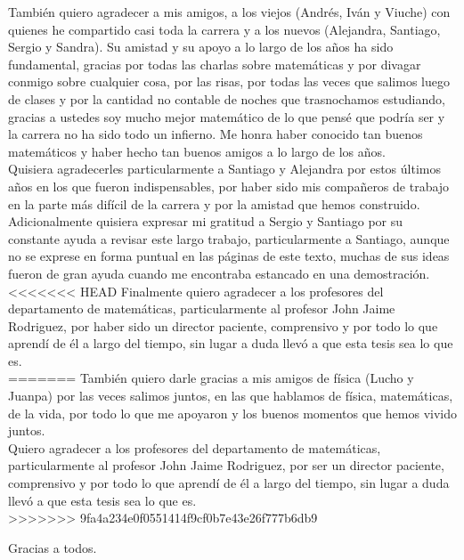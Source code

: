 También quiero agradecer a mis amigos, a los viejos (Andrés, Iván y Viuche) con quienes he compartido casi toda la carrera y a los nuevos (Alejandra, Santiago, Sergio y Sandra). Su amistad y su apoyo a lo largo de los años ha sido fundamental, gracias por todas las charlas sobre matemáticas y por divagar conmigo sobre cualquier cosa, por las risas, por todas las veces que salimos luego de clases y por la cantidad no contable de noches que trasnochamos estudiando, gracias a ustedes soy mucho mejor matemático de lo que pensé que podría ser y la carrera no ha sido todo un infierno. Me honra haber conocido tan buenos matemáticos y haber hecho tan buenos amigos a lo largo de los años.\\
Quisiera agradecerles particularmente a Santiago y Alejandra por estos últimos años en los que fueron indispensables, por haber sido mis compañeros de trabajo en la parte más difícil de la carrera y por la amistad que hemos construido.\\

Adicionalmente quisiera expresar mi gratitud a Sergio y Santiago por su constante ayuda a revisar este largo trabajo, particularmente a Santiago, aunque no se  exprese en forma puntual en las páginas de este texto, muchas de sus ideas fueron de gran ayuda cuando me encontraba estancado en una demostración.\\

<<<<<<< HEAD
Finalmente quiero agradecer a los profesores del departamento de matemáticas, particularmente al profesor John Jaime Rodriguez, por haber sido un director paciente, comprensivo y por todo lo que aprendí de él a largo del tiempo, sin lugar a duda llevó a que esta tesis sea lo que es.\\
=======
También quiero darle gracias a  mis amigos de física (Lucho y Juanpa) por las veces salimos juntos, en las que hablamos de física, matemáticas, de la vida, por todo lo que me apoyaron y los buenos momentos que hemos vivido juntos.\\

Quiero agradecer a los profesores del departamento de matemáticas, particularmente al profesor John Jaime Rodriguez, por ser un director paciente, comprensivo y por todo lo que aprendí de él a largo del tiempo, sin lugar a duda llevó a que esta tesis sea lo que es.\\
>>>>>>> 9fa4a234e0f0551414f9cf0b7e43e26f777b6db9

Gracias a todos.
\thispagestyle{empty}
